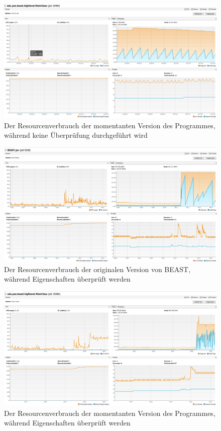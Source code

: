 \documentclass[a4paper]{scrreprt}
\begin{document}
\vspace{4cm}

\begin{figure}[ht]
	\centering
  \includegraphics[width=1.0\textwidth,
  height=0.40\textwidth]{images/NEW_NO.png} \caption{Der Resourcenverbrauch der
  momentanten Version des Programmes, während keine Überprüfung durchgeführt wird}
	\label{fig2}
\end{figure}


\newpage

\begin{figure}[ht]
	\centering
  \includegraphics[width=1.0\textwidth,
  height=0.4\textwidth]{images/OLD_YES.png} \caption{Der Resourcenverbrauch
 der originalen Version von BEAST, während Eigenschaften überprüft werden}
	\label{fig3}
\end{figure}

\vspace{4cm}

\begin{figure}[ht]
	\centering
  \includegraphics[width=1.0\textwidth,
  height=0.40\textwidth]{images/NEW_YES.png} \caption{Der Resourcenverbrauch der
  momentanten Version des Programmes, während Eigenschaften überprüft werden}
	\label{fig4}
\end{figure}
\end{document}
